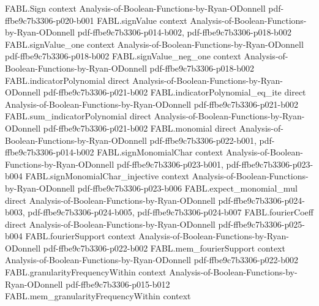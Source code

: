 \begin{theorem}
\label{FABL.abs_fourierCoeff_majority_next_odd_eq}
\leanok
{}
\proofstep
  {FABL.Sign}
  {context}
  {Analysis-of-Boolean-Functions-by-Ryan-ODonnell}
  {pdf-ffbe9c7b3306-p020-b001}
\proofstep
  {FABL.signValue}
  {context}
  {Analysis-of-Boolean-Functions-by-Ryan-ODonnell}
  {pdf-ffbe9c7b3306-p014-b002,
    pdf-ffbe9c7b3306-p018-b002}
\proofstep
  {FABL.signValue_one}
  {context}
  {Analysis-of-Boolean-Functions-by-Ryan-ODonnell}
  {pdf-ffbe9c7b3306-p018-b002}
\proofstep
  {FABL.signValue_neg_one}
  {context}
  {Analysis-of-Boolean-Functions-by-Ryan-ODonnell}
  {pdf-ffbe9c7b3306-p018-b002}
\proofstep
  {FABL.indicatorPolynomial}
  {direct}
  {Analysis-of-Boolean-Functions-by-Ryan-ODonnell}
  {pdf-ffbe9c7b3306-p021-b002}
\proofstep
  {FABL.indicatorPolynomial_eq_ite}
  {direct}
  {Analysis-of-Boolean-Functions-by-Ryan-ODonnell}
  {pdf-ffbe9c7b3306-p021-b002}
\proofstep
  {FABL.sum_indicatorPolynomial}
  {direct}
  {Analysis-of-Boolean-Functions-by-Ryan-ODonnell}
  {pdf-ffbe9c7b3306-p021-b002}
\proofstep
  {FABL.monomial}
  {direct}
  {Analysis-of-Boolean-Functions-by-Ryan-ODonnell}
  {pdf-ffbe9c7b3306-p022-b001,
    pdf-ffbe9c7b3306-p014-b002}
\proofstep
  {FABL.signMonomialChar}
  {context}
  {Analysis-of-Boolean-Functions-by-Ryan-ODonnell}
  {pdf-ffbe9c7b3306-p023-b001,
    pdf-ffbe9c7b3306-p023-b004}
\proofstep
  {FABL.signMonomialChar_injective}
  {context}
  {Analysis-of-Boolean-Functions-by-Ryan-ODonnell}
  {pdf-ffbe9c7b3306-p023-b006}
\proofstep
  {FABL.expect_monomial_mul}
  {direct}
  {Analysis-of-Boolean-Functions-by-Ryan-ODonnell}
  {pdf-ffbe9c7b3306-p024-b003,
    pdf-ffbe9c7b3306-p024-b005,
    pdf-ffbe9c7b3306-p024-b007}
\proofstep
  {FABL.fourierCoeff}
  {direct}
  {Analysis-of-Boolean-Functions-by-Ryan-ODonnell}
  {pdf-ffbe9c7b3306-p025-b004}
\proofstep
  {FABL.fourierSupport}
  {context}
  {Analysis-of-Boolean-Functions-by-Ryan-ODonnell}
  {pdf-ffbe9c7b3306-p022-b002}
\proofstep
  {FABL.mem_fourierSupport}
  {context}
  {Analysis-of-Boolean-Functions-by-Ryan-ODonnell}
  {pdf-ffbe9c7b3306-p022-b002}
\proofstep
  {FABL.granularityFrequencyWithin}
  {context}
  {Analysis-of-Boolean-Functions-by-Ryan-ODonnell}
  {pdf-ffbe9c7b3306-p015-b012}
\proofstep
  {FABL.mem_granularityFrequencyWithin}
  {context}

\end{theorem}
